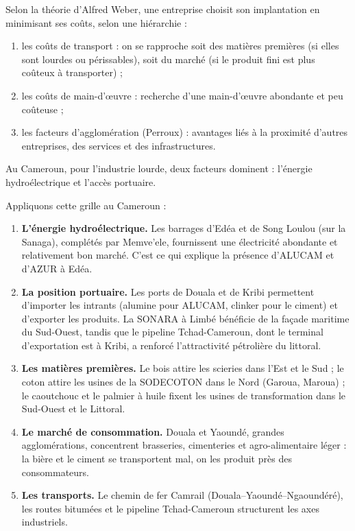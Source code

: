 \documentclass[11pt]{article}
\newcommand{\cle}[1]{{\popxbold\color{popdark}#1}}
\begin{document}
\begin{propriete}
Selon la théorie d'Alfred Weber, une entreprise choisit son implantation en minimisant ses coûts, selon une hiérarchie :
\begin{enumerate}
\item les \cle{coûts de transport} : on se rapproche soit des matières premières (si elles sont lourdes ou périssables), soit du marché (si le produit fini est plus coûteux à transporter) ;
\item les \cle{coûts de main-d'œuvre} : recherche d'une main-d'œuvre abondante et peu coûteuse ;
\item les \cle{facteurs d'agglomération} (Perroux) : avantages liés à la proximité d'autres entreprises, des services et des infrastructures.
\end{enumerate}
Au Cameroun, pour l'industrie lourde, deux facteurs dominent : l'\cle{énergie hydroélectrique} et l'\cle{accès portuaire}.
\end{propriete}

Appliquons cette grille au Cameroun :

\begin{enumerate}
\item \textbf{L'énergie hydroélectrique.} Les barrages d'Edéa et de Song Loulou (sur la Sanaga), complétés par Memve'ele, fournissent une électricité abondante et relativement bon marché. C'est ce qui explique la présence d'ALUCAM et d'AZUR à Edéa.
\item \textbf{La position portuaire.} Les ports de Douala et de Kribi permettent d'importer les intrants (alumine pour ALUCAM, clinker pour le ciment) et d'exporter les produits. La SONARA à Limbé bénéficie de la façade maritime du Sud-Ouest, tandis que le pipeline Tchad-Cameroun, dont le terminal d'exportation est à Kribi, a renforcé l'attractivité pétrolière du littoral.
\item \textbf{Les matières premières.} Le bois attire les scieries dans l'Est et le Sud ; le coton attire les usines de la SODECOTON dans le Nord (Garoua, Maroua) ; le caoutchouc et le palmier à huile fixent les usines de transformation dans le Sud-Ouest et le Littoral.
\item \textbf{Le marché de consommation.} Douala et Yaoundé, grandes agglomérations, concentrent brasseries, cimenteries et agro-alimentaire léger : la bière et le ciment se transportent mal, on les produit près des consommateurs.
\item \textbf{Les transports.} Le chemin de fer Camrail (Douala–Yaoundé–Ngaoundéré), les routes bitumées et le pipeline Tchad-Cameroun structurent les axes industriels.
\end{enumerate}
\end{document}

